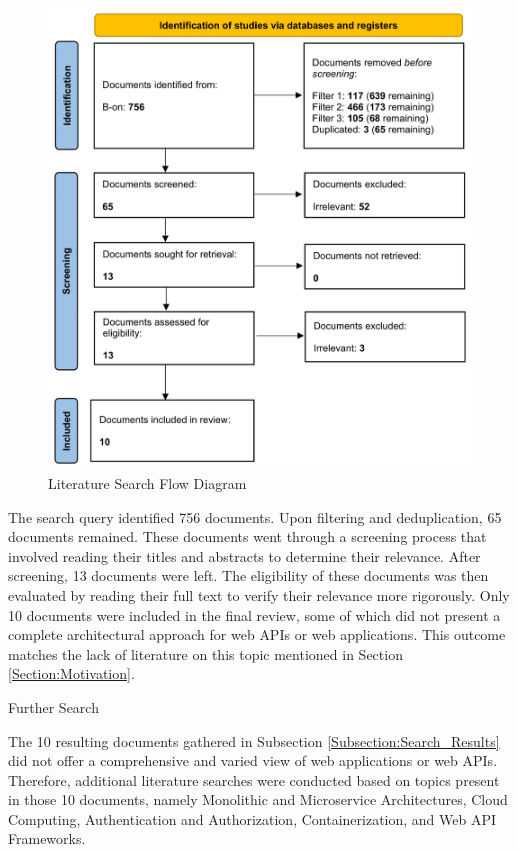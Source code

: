 \documentclass[12pt, reqno]{amsbook}
\makeatletter
\def\subsection{\@startsection{subsection}{2}%
      \z@{.5\linespacing\@plus.7\linespacing}{.25\linespacing}%
      {\normalfont\bfseries\flushleft}}
\theoremstyle{definition}
\theoremstyle{definition}
\numberwithin{section}{chapter}
\numberwithin{table}{chapter}
\numberwithin{figure}{chapter}
\makeatother
\begin{document}
\begin{figure}[H]
  \centering
  \includegraphics[width=0.9\linewidth]{images/Literature_Search_Flow_Diagram.png}
  \caption{\label{Figure:Literature_Search_Flow_Diagram}Literature Search Flow Diagram}
\end{figure}

The search query identified 756 documents. Upon filtering and deduplication, 65 documents remained. These documents went through a screening process that involved reading their titles and abstracts to determine their relevance. After screening, 13 documents were left. The eligibility of these documents was then evaluated by reading their full text to verify their relevance more rigorously. Only 10 documents were included in the final review, some of which did not present a complete architectural approach for web \acp{API} or web applications. This outcome matches the lack of literature on this topic mentioned in Section \ref{Section:Motivation}.

\subsection{Further Search}
\label{Subsection:Further_Search}

The 10 resulting documents gathered in Subsection \ref{Subsection:Search_Results} did not offer a comprehensive and varied view of web applications or web \acp{API}. Therefore, additional literature searches were conducted based on topics present in those 10 documents, namely Monolithic and Microservice Architectures, Cloud Computing, Authentication and Authorization, Containerization, and Web \ac{API} Frameworks.
\end{document}

